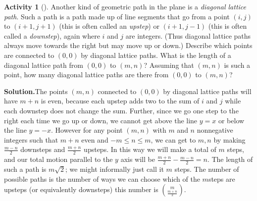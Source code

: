 \documentclass[10pt,]{book}
\theoremstyle{plain}
\theoremstyle{definition}
\newtheorem{activity}[project]{Activity}
\numberwithin{equation}{chapter}
\begin{document}
\begin{activity}[]\label{diagonallattice}
Another kind of geometric path in the plane is a \emph{diagonal lattice path}. Such a path is a path made up of line segments that go from a point \((i,j)\) to \((i+1,j+1)\) (this is often called an \emph{upstep}) or \((i+1,j-1)\) (this is often called a \emph{downstep}), again where \(i\) and \(j\) are integers. (Thus diagonal lattice paths always move towards the right but may move up or down.) Describe which points are connected to \((0,0)\) by diagonal lattice paths. What is the length of a diagonal lattice path from \((0,0)\) to \((m,n)\)? Assuming that \((m,n)\) is such a point, how many diagonal lattice paths are there from \((0,0)\) to \((m,n)\)?%
\par\medskip\noindent%
\textbf{Solution.}\quad The points \((m,n)\) connected to \((0,0)\) by diagonal lattice paths will have \(m+n\) is even, because each upstep adds two to the sum of \(i\) and \(j\) while each downstep does not change the sum.  Further, since we go one step to the right each time we go up or down, we cannot get above the line \(y=x\) or below the line \(y=-x\). However for any point \((m,n)\) with \(m\) and \(n\) nonnegative integers such that \(m+n\) even and \(-m\le n\le m\), we can get to \(m,n\) by making \(\frac{m-n}{2}\) downsteps and \(\frac{m+n}{2}\) upsteps. In this way we will make a total of \(m\) steps, and our total motion parallel to the \(y\) axis will be \(\frac{m+n}{2}-\frac{m-n}{2} = n\).  The length of such a path is \(m\sqrt{2}\); we might informally just call it \(m\) steps. The number of possible paths is the number of ways we can choose which of the \(m\)steps are upsteps (or equivalently downsteps) this number is \(\binom{m}{\frac{m+n}{2}}\).%
\end{activity}
\end{document}
